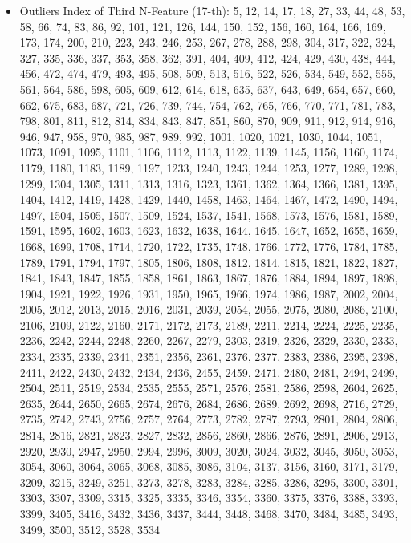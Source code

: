 \documentclass{article}
\begin{document}
\begin{itemize}
    \item Outliers Index of Third N-Feature (17-th): 5, 12, 14, 17, 18, 27, 33, 44, 48, 53, 58, 66, 74, 83, 86, 92, 101, 121, 126, 144, 150, 152, 156, 160, 164, 166, 169, 173, 174, 200, 210, 223, 243, 246, 253, 267, 278, 288, 298, 304, 317, 322, 324, 327, 335, 336, 337, 353, 358, 362, 391, 404, 409, 412, 424, 429, 430, 438, 444, 456, 472, 474, 479, 493, 495, 508, 509, 513, 516, 522, 526, 534, 549, 552, 555, 561, 564, 586, 598, 605, 609, 612, 614, 618, 635, 637, 643, 649, 654, 657, 660, 662, 675, 683, 687, 721, 726, 739, 744, 754, 762, 765, 766, 770, 771, 781, 783, 798, 801, 811, 812, 814, 834, 843, 847, 851, 860, 870, 909, 911, 912, 914, 916, 946, 947, 958, 970, 985, 987, 989, 992, 1001, 1020, 1021, 1030, 1044, 1051, 1073, 1091, 1095, 1101, 1106, 1112, 1113, 1122, 1139, 1145, 1156, 1160, 1174, 1179, 1180, 1183, 1189, 1197, 1233, 1240, 1243, 1244, 1253, 1277, 1289, 1298, 1299, 1304, 1305, 1311, 1313, 1316, 1323, 1361, 1362, 1364, 1366, 1381, 1395, 1404, 1412, 1419, 1428, 1429, 1440, 1458, 1463, 1464, 1467, 1472, 1490, 1494, 1497, 1504, 1505, 1507, 1509, 1524, 1537, 1541, 1568, 1573, 1576, 1581, 1589, 1591, 1595, 1602, 1603, 1623, 1632, 1638, 1644, 1645, 1647, 1652, 1655, 1659, 1668, 1699, 1708, 1714, 1720, 1722, 1735, 1748, 1766, 1772, 1776, 1784, 1785, 1789, 1791, 1794, 1797, 1805, 1806, 1808, 1812, 1814, 1815, 1821, 1822, 1827, 1841, 1843, 1847, 1855, 1858, 1861, 1863, 1867, 1876, 1884, 1894, 1897, 1898, 1904, 1921, 1922, 1926, 1931, 1950, 1965, 1966, 1974, 1986, 1987, 2002, 2004, 2005, 2012, 2013, 2015, 2016, 2031, 2039, 2054, 2055, 2075, 2080, 2086, 2100, 2106, 2109, 2122, 2160, 2171, 2172, 2173, 2189, 2211, 2214, 2224, 2225, 2235, 2236, 2242, 2244, 2248, 2260, 2267, 2279, 2303, 2319, 2326, 2329, 2330, 2333, 2334, 2335, 2339, 2341, 2351, 2356, 2361, 2376, 2377, 2383, 2386, 2395, 2398, 2411, 2422, 2430, 2432, 2434, 2436, 2455, 2459, 2471, 2480, 2481, 2494, 2499, 2504, 2511, 2519, 2534, 2535, 2555, 2571, 2576, 2581, 2586, 2598, 2604, 2625, 2635, 2644, 2650, 2665, 2674, 2676, 2684, 2686, 2689, 2692, 2698, 2716, 2729, 2735, 2742, 2743, 2756, 2757, 2764, 2773, 2782, 2787, 2793, 2801, 2804, 2806, 2814, 2816, 2821, 2823, 2827, 2832, 2856, 2860, 2866, 2876, 2891, 2906, 2913, 2920, 2930, 2947, 2950, 2994, 2996, 3009, 3020, 3024, 3032, 3045, 3050, 3053, 3054, 3060, 3064, 3065, 3068, 3085, 3086, 3104, 3137, 3156, 3160, 3171, 3179, 3209, 3215, 3249, 3251, 3273, 3278, 3283, 3284, 3285, 3286, 3295, 3300, 3301, 3303, 3307, 3309, 3315, 3325, 3335, 3346, 3354, 3360, 3375, 3376, 3388, 3393, 3399, 3405, 3416, 3432, 3436, 3437, 3444, 3448, 3468, 3470, 3484, 3485, 3493, 3499, 3500, 3512, 3528, 3534
\end{itemize}
\end{document}
